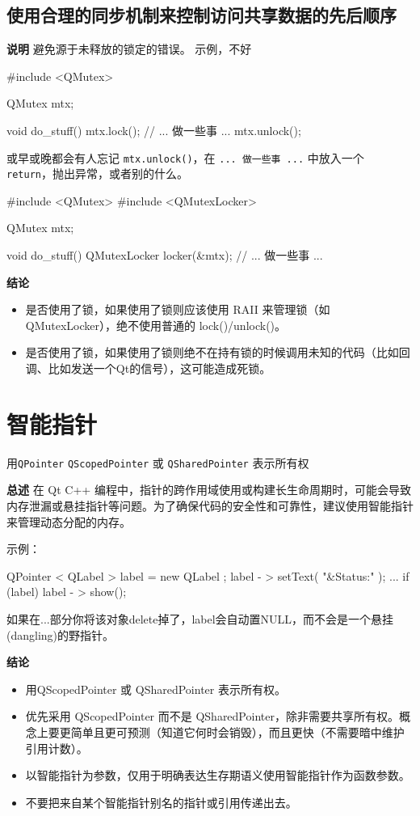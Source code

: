 \subsection{使用合理的同步机制来控制访问共享数据的先后顺序}

\textbf{说明}
避免源于未释放的锁定的错误。
示例，不好

\begin{ccode}
#include <QMutex>

QMutex mtx;

void do_stuff() {
    mtx.lock();
    // ... 做一些事 ...
    mtx.unlock();
}
\end{ccode}

或早或晚都会有人忘记 \verb|mtx.unlock()|，在 \verb|... 做一些事 ...| 中放入一个 \verb|return|，抛出异常，或者别的什么。

\begin{ccode}
#include <QMutex>
#include <QMutexLocker>

QMutex mtx;

void do_stuff() {
    QMutexLocker locker(&mtx);
    // ... 做一些事 ...
}
\end{ccode}

\textbf{结论}

\begin{itemize}
  \item 是否使用了锁，如果使用了锁则应该使用 RAII 来管理锁（如 QMutexLocker），绝不使用普通的 lock()/unlock()。
  \item 是否使用了锁，如果使用了锁则绝不在持有锁的时候调用未知的代码（比如回调、比如发送一个Qt的信号），这可能造成死锁。
\end{itemize}
  
\section{智能指针} \label{qt-smart-pointer}

\begin{DNote}
用\verb|QPointer|  \verb|QScopedPointer| 或 \verb|QSharedPointer| 表示所有权
\end{DNote}

\textbf{总述}
在 Qt C++ 编程中，指针的跨作用域使用或构建长生命周期时，可能会导致内存泄漏或悬挂指针等问题。为了确保代码的安全性和可靠性，建议使用智能指针来管理动态分配的内存。

示例：
\begin{ccode} 
     QPointer < QLabel > label =  new  QLabel ; 
     label - > setText( "\&Status:" ); 
     ... 
     if (label) 
         label - > show();
\end{ccode}
     如果在...部分你将该对象delete掉了，label会自动置NULL，而不会是一个悬挂(dangling)的野指针。

\textbf{结论}
\begin{itemize}
  \item  用QScopedPointer  或 QSharedPointer 表示所有权。
  \item  优先采用 QScopedPointer 而不是 QSharedPointer，除非需要共享所有权。概念上要更简单且更可预测（知道它何时会销毁），而且更快（不需要暗中维护引用计数）。
  \item  以智能指针为参数，仅用于明确表达生存期语义使用智能指针作为函数参数。
  \item  不要把来自某个智能指针别名的指针或引用传递出去。
\end{itemize}

